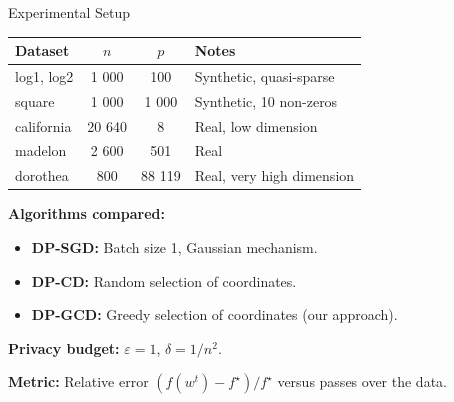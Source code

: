 \documentclass[10pt]{beamer}
\begin{document}
\begin{frame}{Experimental Setup}
\begin{table}
\scriptsize
\begin{tabular}{@{}lccl@{}}
\toprule
\textbf{Dataset} & $n$ & $p$ & \textbf{Notes} \\
\midrule
log1, log2 & 1 000 & 100 & Synthetic, quasi-sparse \\
square & 1 000 & 1 000 & Synthetic, 10 non-zeros \\
california & 20 640 & 8 & Real, low dimension \\
madelon & 2 600 & 501 & Real \\
dorothea & 800 & \alert{88 119} & Real, very high dimension \\
\bottomrule
\end{tabular}
\end{table}

\vspace{1em}
\textbf{Algorithms compared:}
\begin{itemize}
\item \textbf{DP-SGD:} Batch size 1, Gaussian mechanism.
\item \textbf{DP-CD:} Random selection of coordinates.
\item \textbf{DP-GCD:} Greedy selection of coordinates (our approach).
\end{itemize}

\vspace{0.5em}
\textbf{Privacy budget:} $\varepsilon = 1$, $\delta = 1/n^2$.

\vspace{0.5em}
\textbf{Metric:} Relative error $(f(w^t) - f^\star) / f^\star$ versus passes over the data.
\end{frame}
\end{document}
